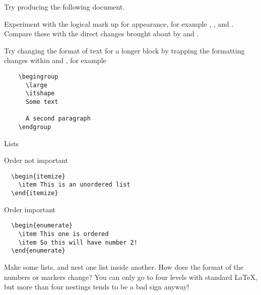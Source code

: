 \begin{exercise}
  Try producing the following document.
  
  
  Experiment with the logical mark up for appearance, for example
  , ,  and . Compare these
  with the direct changes brought about by  and .
  
  Try changing the format of text for a longer block by trapping the
  formatting changes within  and , for
  example
  \begin{verbatim}
    \begingroup
      \large
      \itshape
      Some text
      
      A second paragraph
    \endgroup
  \end{verbatim}
  
\end{exercise}

\begin{frame}[fragile]{Lists}

  \begin{block}{Order not important}
\begin{verbatim}
  \begin{itemize}
    \item This is an unordered list
  \end{itemize}
\end{verbatim}
  \end{block}
  
  \begin{block}{Order important}
\begin{verbatim}
  \begin{enumerate}
    \item This one is ordered
    \item So this will have number 2!
  \end{enumerate}
\end{verbatim}
  \end{block}

\end{frame}

\begin{exercise}
  Make some lists, and nest one list inside another. How does the
  format of the numbers or markers change? You can only go to
  four levels with standard \LaTeX{}, but more than four nestings
  tends to be a bad sign anyway!
\end{exercise}


